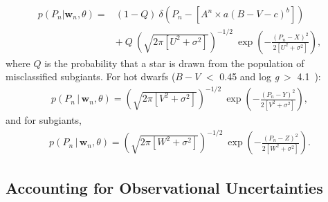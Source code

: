 \documentclass[11pt,preprint]{aastex}
\newcommand{\logg}{log \emph{g}}
\newcommand{\w}{\mathbf{w}}
\newcommand{\subcut}{4.1~}
\begin{document}
\begin{eqnarray}
p(P_n|\w_n,\theta) =
& (1-Q)~\delta \left (P_n - \left[A^n \times a(B-V - c)^b\right] \right) \quad \\
	& +~Q~\left(\sqrt{2\pi[U^2+\sigma^2]}\right)^{-1/2}~\exp\left({-\frac{(P_n-X)^2}{2[U^2+\sigma^2]}}\right),
\end{eqnarray}
where $Q$ is the probability that a star is drawn from the population of misclassified subgiants.
For hot dwarfs ($B-V$ $<$ 0.45 and \logg$~>$ \subcut):
\begin{eqnarray}
p(P_n\,|\,\w_n,\theta) = \left(\sqrt{2\pi[V^2+\sigma^2]}\right)^{-1/2}~\exp\left({-\frac{(P_n-Y)^2}{2[V^2+\sigma^2]}}\right),
\end{eqnarray}
and for subgiants,
\begin{eqnarray}
p(P_n\,|\,\w_n,\theta) = \left(\sqrt{2\pi[W^2+\sigma^2]}\right)^{-1/2}~\exp\left({-\frac{(P_n-Z)^2}{2[W^2+\sigma^2]}}\right).
\end{eqnarray}

\subsection{Accounting for Observational Uncertainties}
\end{document}
